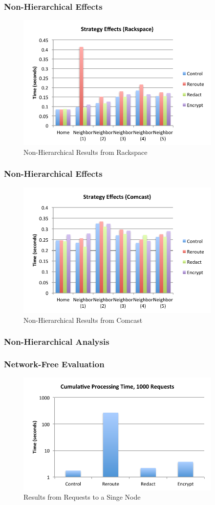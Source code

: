 \documentclass[t,handout]{beamer}
\begin{document}
\begin{frame}
\frametitle{Non-Hierarchical Effects}
\begin{figure}[!t]
\centering
\includegraphics[width=4in]{nh_strategy_effects_rs}
\caption{Non-Hierarchical  Results from Rackspace}
\end{figure}
\end{frame}

\begin{frame}
\frametitle{Non-Hierarchical Effects}
\begin{figure}[!t]
\centering
\includegraphics[width=4in]{nh_strategy_effects_local}
\caption{Non-Hierarchical Results from Comcast}
\end{figure}
\end{frame}

\begin{frame}
\frametitle{Non-Hierarchical Analysis}

\end{frame}

\begin{frame}
\frametitle{Network-Free Evaluation}
\begin{figure}[!t]
\centering
\includegraphics[width=4in]{single-node-results}
\caption{Results from Requests to a Singe Node}
\end{figure}
\end{frame}
\end{document}
